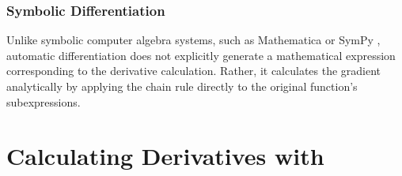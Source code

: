 \documentclass[10pt]{article}
\begin{document}
\subsubsection{Symbolic Differentiation}

Unlike symbolic computer algebra systems, such as Mathematica
\citep{mathematica:2014} or SymPy \citep{sympy:2014}, automatic
differentiation does not explicitly generate a mathematical expression
corresponding to the derivative calculation.  Rather, it calculates
the gradient analytically by applying the chain rule directly to the
original function's subexpressions.





\section{Calculating Derivatives with }
\end{document}
